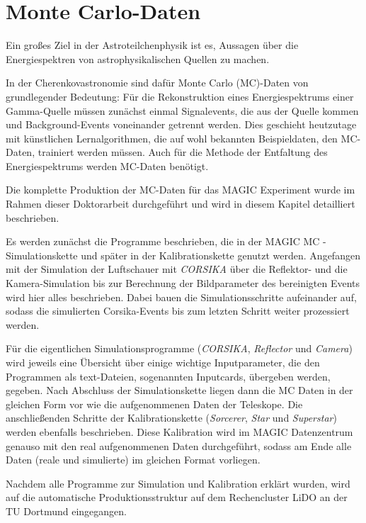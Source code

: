 \chapter{Monte Carlo-Daten}
Ein großes Ziel in der Astroteilchenphysik ist es, Aussagen über die Energiespektren von astrophysikalischen Quellen zu machen.

In der Cherenkovastronomie sind dafür Monte Carlo (MC)-Daten von grundlegender Bedeutung:
Für die Rekonstruktion eines Energiespektrums einer Gamma-Quelle müssen zunächst einmal Signalevents, die aus der Quelle kommen und Background-Events voneinander getrennt werden.
Dies geschieht heutzutage mit künstlichen Lernalgorithmen, die auf wohl bekannten Beispieldaten, den MC-Daten, trainiert werden müssen.
Auch für die Methode der Entfaltung des Energiespektrums werden MC-Daten benötigt.

Die komplette Produktion der MC-Daten für das MAGIC Experiment wurde im Rahmen dieser Doktorarbeit durchgeführt und wird in diesem Kapitel detailliert beschrieben.

Es werden zunächst die Programme beschrieben, die in der MAGIC MC - Simulationskette und später in der Kalibrationskette genutzt werden.
Angefangen mit der Simulation der Luftschauer mit \textit{CORSIKA} über die Reflektor- und die Kamera-Simulation bis zur Berechnung der Bildparameter des bereinigten Events wird hier alles beschrieben.
Dabei bauen die Simulationsschritte aufeinander auf, sodass die simulierten Corsika-Events bis zum letzten Schritt weiter prozessiert werden.

Für die eigentlichen Simulationsprogramme (\textit{CORSIKA}, \textit{Reflector} und \textit{Camera}) wird jeweils eine Übersicht über einige wichtige Inputparameter, die den Programmen als text-Dateien,
sogenannten Inputcards, übergeben werden, gegeben.
Nach Abschluss der Simulationskette liegen dann die MC Daten in der gleichen Form vor wie die aufgenommenen Daten der Teleskope. 
Die anschließenden Schritte der Kalibrationskette (\textit{Sorcerer}, \textit{Star} und \textit{Superstar}) werden ebenfalls beschrieben.
Diese Kalibration wird im MAGIC Datenzentrum genauso mit den real aufgenommenen Daten durchgeführt, sodass am Ende alle Daten (reale und simulierte) im gleichen Format vorliegen.

Nachdem alle Programme zur Simulation und Kalibration erklärt wurden, wird auf die automatische Produktionsstruktur auf dem Rechencluster LiDO an der TU Dortmund eingegangen.

